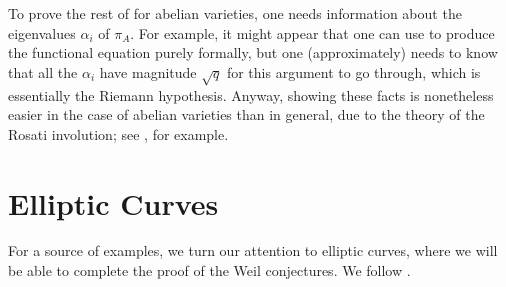\documentclass{amsart}
\begin{document}
\begin{remark} \label{rem:go-no-further}
	To prove the rest of  for abelian varieties, one needs information about the eigenvalues $\alpha_i$ of $\pi_A$. For example, it might appear that one can use  to produce the functional equation purely formally, but one (approximately) needs to know that all the $\alpha_i$ have magnitude $\sqrt q$ for this argument to go through, which is essentially the Riemann hypothesis. Anyway, showing these facts is nonetheless easier in the case of abelian varieties than in general, due to the theory of the Rosati involution; see \cite[Section~I.14]{milne-av}, for example.
\end{remark}

\section{Elliptic Curves} \label{sec:ec}
For a source of examples, we turn our attention to elliptic curves, where we will be able to complete the proof of the Weil conjectures. We follow \cite[Section~V.2]{silverman}.
\end{document}
